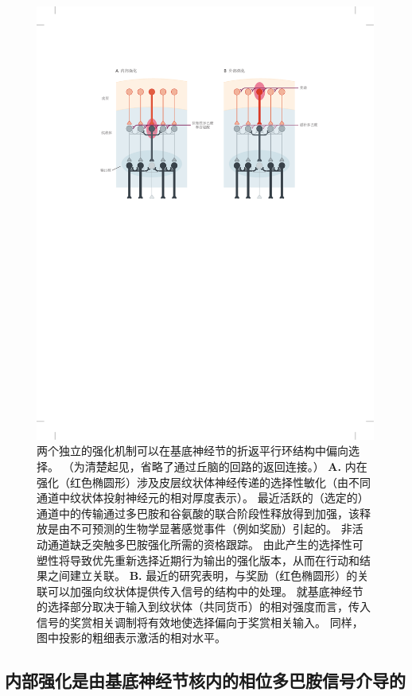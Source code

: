 \begin{figure}[htbp]
	\centering
	\includegraphics[width=0.96\linewidth]{chap38/fig_38_8}
	\caption{两个独立的强化机制可以在基底神经节的折返平行环结构中偏向选择。
		（为清楚起见，省略了通过丘脑的回路的返回连接。）
		\textbf{A.} 内在强化（红色椭圆形）涉及皮层纹状体神经传递的选择性敏化（由不同通道中纹状体投射神经元的相对厚度表示）。
		最近活跃的（选定的）通道中的传输通过多巴胺和谷氨酸的联合阶段性释放得到加强，该释放是由不可预测的生物学显著感觉事件（例如奖励）引起的。
		非活动通道缺乏突触多巴胺强化所需的资格跟踪。
		由此产生的选择性可塑性将导致优先重新选择近期行为输出的强化版本，从而在行动和结果之间建立关联。
		\textbf{B.} 最近的研究表明，与奖励（红色椭圆形）的关联可以加强向纹状体提供传入信号的结构中的处理。
		就基底神经节的选择部分取决于输入到纹状体（共同货币）的相对强度而言，传入信号的奖赏相关调制将有效地使选择偏向于奖赏相关输入。
		同样，图中投影的粗细表示激活的相对水平。}
	\label{fig:38_8}
\end{figure}



\subsection{内部强化是由基底神经节核内的相位多巴胺信号介导的}


